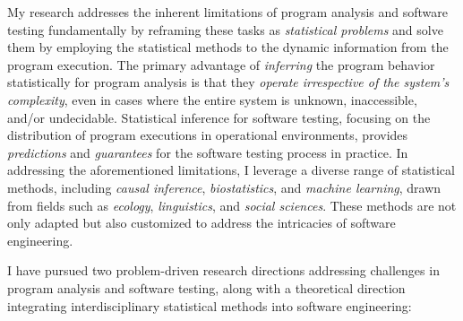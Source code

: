 \documentclass{article}
\begin{document}
My research addresses the inherent limitations of program analysis and software testing fundamentally by reframing these tasks as \emph{statistical problems} and solve them by employing the statistical methods to the dynamic information from the program execution. The primary advantage of \emph{inferring} the program behavior statistically for program analysis is that they \emph{operate irrespective of the system's complexity}, even in cases where the entire system is unknown, inaccessible, and/or undecidable. Statistical inference for software testing, focusing on the distribution of program executions in operational environments, provides \emph{predictions} and \emph{guarantees} for the software testing process in practice.
In addressing the aforementioned limitations, I leverage a diverse range of statistical methods, including \emph{causal inference}, \emph{biostatistics}, and \emph{machine learning}, drawn from fields such as \emph{ecology}, \emph{linguistics}, and \emph{social sciences}. These methods are not only adapted but also customized to address the intricacies of software engineering. 

\vspace{.5em}
\noindent
I have pursued two problem-driven research directions addressing challenges in program analysis and software testing, along with a theoretical direction integrating interdisciplinary statistical methods into software engineering:
\vspace{-.4em}
\end{document}
